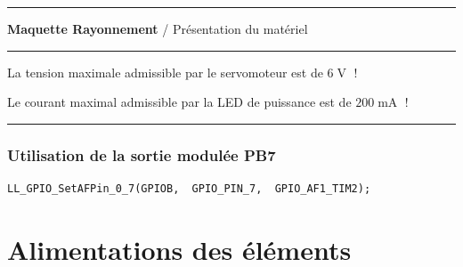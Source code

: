 \documentclass[a4paper,11pt,titlepage]{article} %
\begin{document}
\vspace{0.5cm}

\noindent \rule{\linewidth}{1pt}

{\noindent\Large \rule[-7pt]{0pt}{30pt} \textbf{Maquette Rayonnement} / Présentation du matériel}

\noindent \rule{\linewidth}{1pt}

\bigskip

{\LARGE La tension maximale admissible par le servomoteur est de $6\operatorname{V}$ !}

{\Large Le courant maximal admissible par la LED de puissance est de $200\operatorname{mA}$ !}

\bigskip

\noindent \rule{\linewidth}{1pt}






\subsubsection{Utilisation de la sortie modulée PB7}
	
\begin{lstlisting}
LL_GPIO_SetAFPin_0_7(GPIOB,  GPIO_PIN_7,  GPIO_AF1_TIM2);
\end{lstlisting}


\section{Alimentations des éléments}
\end{document}
